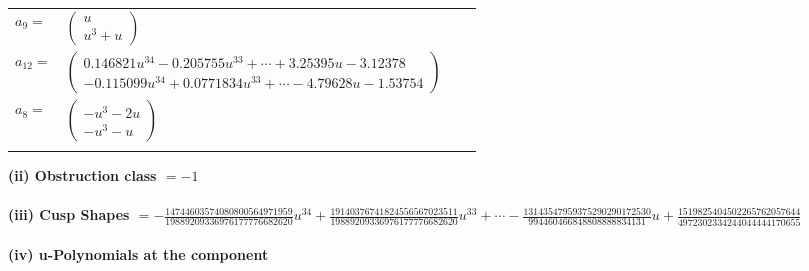\documentclass[1p]{elsarticle_modified}
\theoremstyle{definition}
\begin{document}
\begin{tabular}{m{7pt} m{180pt} m{7pt} m{180pt} }
\flushright $a_{9}=$&$\begin{pmatrix}u\\u^3+u\end{pmatrix}$ \\
\flushright $a_{12}=$&$\begin{pmatrix}0.146821 u^{34}-0.205755 u^{33}+\cdots+3.25395 u-3.12378\\-0.115099 u^{34}+0.0771834 u^{33}+\cdots-4.79628 u-1.53754\end{pmatrix}$ \\
\flushright $a_{8}=$&$\begin{pmatrix}- u^3-2 u\\- u^3- u\end{pmatrix}$\\&\end{tabular}
\flushleft \textbf{(ii) Obstruction class $= -1$}\\~\\
\flushleft \textbf{(iii) Cusp Shapes $= -\frac{14744603574080800564971959}{19889209336976177776682620} u^{34}+\frac{19140376741824556567023511}{19889209336976177776682620} u^{33}+\cdots-\frac{13143547959375290290172530}{994460466848808888834131} u+\frac{1519825404502265762057644}{4972302334244044444170655}$}\\~\\
\newpage\renewcommand{\arraystretch}{1}
\flushleft \textbf{(iv) u-Polynomials at the component}\newline \\
\end{document}
